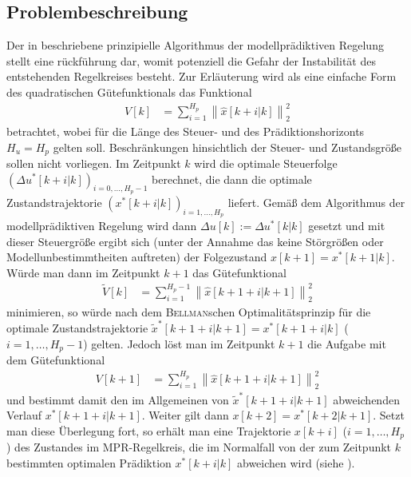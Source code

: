\subsection{Problembeschreibung}
\label{subsec:kap_4_problembeschreibung}
Der in  beschriebene prinzipielle Algorithmus der modellprädiktiven Regelung stellt eine rückführung dar, womit potenziell die Gefahr der Instabilität
des entstehenden Regelkreises besteht. Zur Erläuterung wird als eine einfache Form des quadratischen Gütefunktionals das Funktional
\begin{align}
	V[k] & = \sum\limits_{i=1}^{H_p}\left\| \hat{x}[k+i|k] \right\|_2^2
\end{align}
betrachtet, wobei für die Länge des Steuer- und des Prädiktionshorizonts $H_u=H_p$ gelten soll. Beschränkungen hinsichtlich der Steuer- und Zustandsgröße sollen nicht vorliegen. Im
Zeitpunkt $k$ wird die optimale Steuerfolge $(\Delta u^{\ast}[k+i|k])_{i=0,\ldots,H_p-1}$ berechnet, die dann die optimale Zustandstrajektorie $(x^{\ast}[k+i|k])_{i=1,\ldots,H_p}$
liefert. Gemäß dem Algorithmus der modellprädiktiven Regelung wird dann $\Delta u[k]:=\Delta u^{\ast}[k|k]$ gesetzt und mit dieser Steuergröße ergibt sich (unter der Annahme das keine
Störgrößen oder Modellunbestimmtheiten auftreten) der Folgezustand $x[k+1]=x^{\ast}[k+1|k]$. Würde man dann im Zeitpunkt $k+1$ das Gütefunktional
\begin{align}
	\tilde{V}[k] & = \sum\limits_{i=1}^{H_p-1}\left\| \hat{x}[k+1+i|k+1] \right\|_2^2
\end{align}
minimieren, so würde nach dem \textsc{Bellman}schen Optimalitätsprinzip für die optimale Zustandstrajektorie $\tilde{x}^{\ast}[k+1+i|k+1]=x^{\ast}[k+1+i|k]$ ($i=1,\ldots,H_p-1$) gelten.
Jedoch löst man im Zeitpunkt $k+1$ die Aufgabe mit dem Gütefunktional
\begin{align}
	V[k+1] & = \sum\limits_{i=1}^{H_p}\left\| \hat{x}[k+1+i|k+1] \right\|_2^2
\end{align}
und bestimmt damit den im Allgemeinen von $\tilde{x}^{\ast}[k+1+i|k+1]$ abweichenden Verlauf $x^{\ast}[k+1+i|k+1]$. Weiter gilt dann $x[k+2]=x^{\ast}[k+2|k+1]$. Setzt man diese
Überlegung fort, so erhält man eine Trajektorie $x[k+i]$ ($i=1,\ldots,H_p$) des Zustandes im \ac{MPR}-Regelkreis, die im Normalfall von der zum Zeitpunkt $k$ bestimmten optimalen
Prädiktion $x^{\ast}[k+i|k]$ abweichen wird (siehe ).


